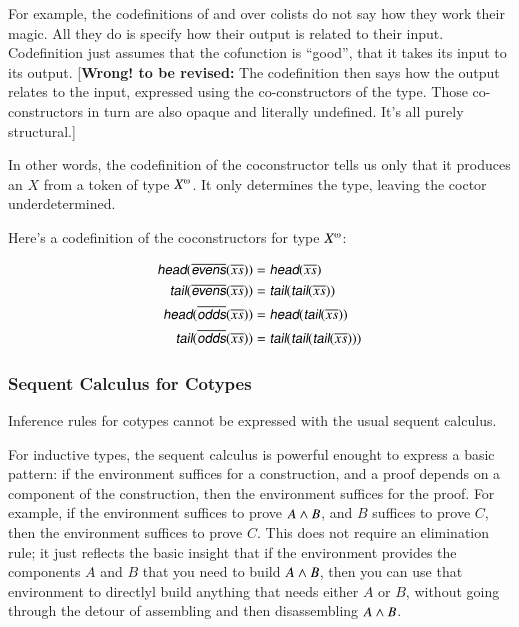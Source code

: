 \documentclass{article}
\begin{document}
For example, the codefinitions of  and  over
colists do not say how they work their magic. All they do is specify
how their output is related to their input. Codefinition just assumes
that the cofunction is ``good'', that it takes its input to its
output. [\textbf{Wrong! to be revised:}
The codefinition then says how the output relates to the
input, expressed using the co-constructors of the type. Those
co-constructors in turn are also opaque and literally undefined. It's
all purely structural.]

In other words, the codefinition of the coconstructor \cohead{} tells
us only that it produces an \(X\) from a token of type \(\colist{X}\).
It only determines the type, leaving the coctor underdetermined.

Here's a codefinition of the coconstructors for type \(\colist{X}\):

\begin{align}
  \cohead(\codefn{evens}(\coseq{x})) & = \cohead(\coseq{x}) \\
  \cotail(\codefn{evens}(\coseq{x})) & = \cotail(\cotail(\coseq{x})) \\
  \cohead(\codefn{odds}(\coseq{x})) & = \cohead(\cotail(\coseq{x})) \\
  \cotail(\codefn{odds}(\coseq{x})) & = \cotail(\cotail(\cotail(\coseq{x})))
\end{align}

\subsubsection{Sequent Calculus for Cotypes}

Inference rules for cotypes cannot be expressed with the usual sequent
calculus.

For inductive types, the sequent calculus is powerful enought to
express a basic pattern: if the environment suffices for a
construction, and a proof depends on a component of the construction,
then the environment suffices for the proof. For example, if the
environment suffices to prove \(A\land B\), and \(B\) suffices to
prove \(C\), then the environment suffices to prove \(C\). This does
not require an elimination rule; it just reflects the basic insight
that if the environment provides the components \(A\) and \(B\) that
you need to build \(A\land B\), then you can use that environment to
directlyl build anything that needs either \(A\) or \(B\), without
going through the detour of assembling and then disassembling
\(A\land B\).
\end{document}
